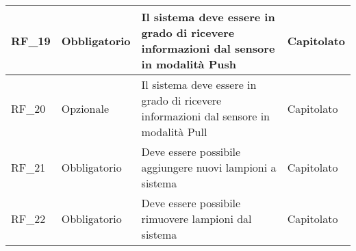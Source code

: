 \begin{center}
\begin{xltabular}{\linewidth}{|l|l|X|l|}
        \hline
        RF\_19 & Obbligatorio & Il sistema deve essere in grado di ricevere informazioni dal sensore in modalità Push & Capitolato \\

        \hline
        RF\_20 & Opzionale & Il sistema deve essere in grado di ricevere informazioni dal sensore in modalità Pull & Capitolato \\

        \hline
        RF\_21 & Obbligatorio & Deve essere possibile aggiungere nuovi lampioni a sistema & Capitolato\\

        \hline
        RF\_22 & Obbligatorio & Deve essere possibile rimuovere lampioni dal sistema & Capitolato\\

        \hline
    \end{xltabular}
\end{center}


